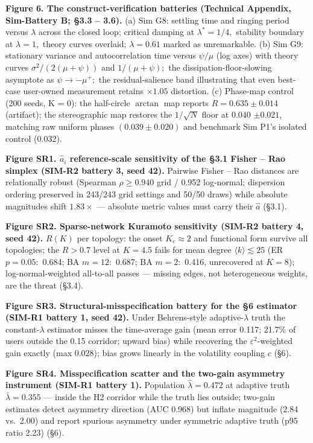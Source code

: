 \documentclass[
]{article}
\begin{document}
\textbf{Figure 6. The construct-verification batteries (Technical
Appendix, Sim-Battery B; §3.3 -- 3.6).} (a) Sim G8: settling time and
ringing period versus \(\lambda\) across the closed loop; critical
damping at \(\lambda^{*} = 1/4,\) stability boundary at \(\lambda = 1,\)
theory curves overlaid; \(\lambda = 0.61\) marked as unremarkable. (b)
Sim G9: stationary variance and autocorrelation time versus \(\psi/\mu\)
(log axes) with theory curves \(\sigma^{2}/(2(\mu+\psi))\) and
\(1/(\mu+\psi);\) the dissipation-floor-slowing asymptote as
\(\psi \to -\mu^{+};\) the residual-salience band illustrating that even
best-case user-owned measurement retains \(\times1.05\) distortion. (c)
Phase-map control (200 seeds, K = 0): the half-circle \(\arctan\) map
reports \(R = 0.635 \pm 0.014\) (artifact); the stereographic map
restores the \(1/\sqrt{N}\) floor at 0.040 \(\pm 0.021,\) matching raw
uniform phases \((0.039 \pm 0.020)\) and benchmark Sim P1's isolated
control (0.032).

\textbf{Figure SR1. \(\hat{a}_i\) reference-scale sensitivity of the
§3.1 Fisher -- Rao simplex (SIM-R2 battery 3, seed 42).} Pairwise Fisher
-- Rao distances are relationally robust (Spearman \(\rho \geq 0.940\)
grid / 0.952 log-normal; dispersion ordering preserved in 243/243 grid
settings and 50/50 draws) while absolute magnitudes shift \(1.83\times\)
--- absolute metric values must carry their \(\hat{a}\) (§3.1).

\textbf{Figure SR2. Sparse-network Kuramoto sensitivity (SIM-R2 battery
4, seed 42).} \(R(K)\) per topology: the onset \(K_c \approx 2\) and
functional form survive all topologies; the \(R > 0.7\) level at
\(K = 4.5\) fails for mean degree \(\langle k\rangle \lesssim 25\) (ER
\(p = 0.05:\) 0.684; BA \(m = 12:\) 0.687; BA \(m = 2:\) 0.416,
unrecovered at \(K = 8\)); log-normal-weighted all-to-all passes ---
missing edges, not heterogeneous weights, are the threat (§3.4).

\textbf{Figure SR3. Structural-misspecification battery for the §6
estimator (SIM-R1 battery 1, seed 42).} Under Behrens-style
adaptive-\(\lambda\) truth the constant-\(\lambda\) estimator misses the
time-average gain (mean error 0.117; 21.7\% of users outside the 0.15
corridor; upward bias) while recovering the \(\varepsilon^{2}\)-weighted
gain exactly (max 0.028); bias grows linearly in the volatility coupling
\(c\) (§6).

\textbf{Figure SR4. Misspecification scatter and the two-gain asymmetry
instrument (SIM-R1 battery 1).} Population \(\hat{\lambda} = 0.472\) at
adaptive truth \(\bar{\lambda} = 0.355\) --- inside the H2 corridor
while the truth lies outside; two-gain estimates detect asymmetry
direction (AUC 0.968) but inflate magnitude (2.84 vs.~2.00) and report
spurious asymmetry under symmetric adaptive truth (p95 ratio 2.23) (§6).
\end{document}
